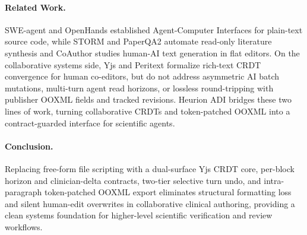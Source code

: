\documentclass[11pt,a4paper]{article}
\begin{document}
\paragraph{Related Work.}
SWE-agent \cite{yang2024sweagent} and OpenHands \cite{wang2024openhands} established Agent-Computer Interfaces for plain-text source code, while STORM \cite{shao2024storm} and PaperQA2 \cite{skarlinski2024paperqa2} automate read-only literature synthesis and CoAuthor \cite{lee2022coauthor} studies human-AI text generation in flat editors. On the collaborative systems side, Yjs \cite{nicolaescu2016yjs} and Peritext \cite{litt2022peritext} formalize rich-text CRDT convergence for human co-editors, but do not address asymmetric AI batch mutations, multi-turn agent read horizons, or lossless round-tripping with publisher OOXML \cite{ecma376ooxml} fields and tracked revisions. Heurion ADI bridges these two lines of work, turning collaborative CRDTs and token-patched OOXML into a contract-guarded interface for scientific agents.

\paragraph{Conclusion.}
Replacing free-form file scripting with a dual-surface Yjs CRDT core, per-block horizon and clinician-delta contracts, two-tier selective turn undo, and intra-paragraph token-patched OOXML export eliminates structural formatting loss and silent human-edit overwrites in collaborative clinical authoring, providing a clean systems foundation for higher-level scientific verification and review workflows.
\end{document}
